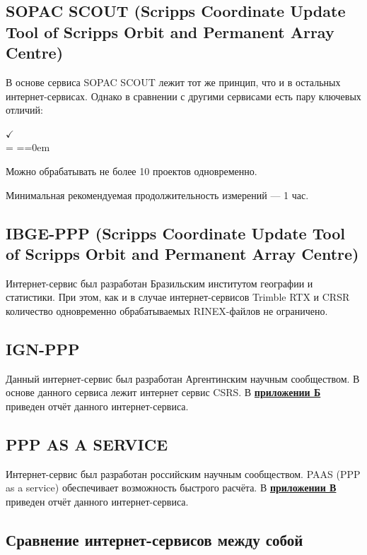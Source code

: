 \subsection{SOPAC SCOUT (Scripps Coordinate Update Tool of Scripps Orbit and Permanent Array Centre)}\label{subsec:ch2/sec1/sub7}

В основе сервиса SOPAC SCOUT лежит тот же принцип, что и в остальных интернет-сервисах. Однако в сравнении с другими сервисами есть пару ключевых отличий:

\begin{list}{$ \checkmark $\\[6pt]} {\parsep = \parskip \itemsep=\parsep \topsep=0em}
	\item Можно обрабатывать не более 10 проектов одновременно. 
	\item Минимальная рекомендуемая продолжительность измерений --- 1 час.
\end{list}


\subsection{IBGE-PPP (Scripps Coordinate Update Tool of Scripps Orbit and Permanent Array Centre)}\label{subsec:ch2/sec1/sub8}

Интернет-сервис был разработан Бразильским институтом географии и статистики. При этом, как и в случае интернет-сервисов Trimble RTX и CRSR количество одновременно обрабатываемых RINEX-файлов не ограничено.


\subsection{IGN-PPP}\label{subsec:ch2/sec1/sub9}

Данный интернет-сервис был разработан Аргентинским научным сообществом. В основе данного сервиса лежит интернет сервис CSRS. В \textbf{\underline{приложении Б}} приведен отчёт данного интернет-сервиса.


\subsection{PPP AS A SERVICE}\label{subsec:ch2/sec1/su10}

Интернет-сервис был разработан российским научным сообществом. PAAS (PPP as a service) обеспечивает возможность быстрого расчёта. В \textbf{\underline{приложении В}} приведен отчёт данного интернет-сервиса.


\subsection{Сравнение интернет-сервисов между собой}\label{subsec:ch2/sec1/sub11}

